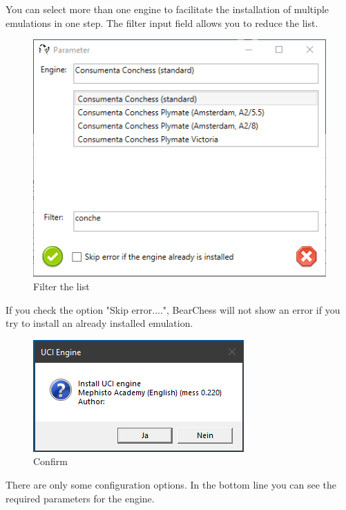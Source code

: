 \documentclass[11pt,a4paper]{article}
\begin{document}
	You can select more than one engine to facilitate the installation of multiple emulations in one step. The filter input field allows you to reduce the list.
	
	\begin{figure}[H]
		\centering
		\includegraphics[scale=0.8]{MessChess5.png}
		\caption{Filter the list}
		\label{fig:MessChess5}
	\end{figure}
	
	If you check the option "Skip error....", BearChess will not show an error if you try to install an already installed emulation.
	
	\begin{figure}[H]
		\centering
		\includegraphics[scale=0.9]{MessChess2.png}
		\caption{Confirm}
		\label{fig:MessChess2}
	\end{figure}
	
	There are only some configuration options. In the bottom line you can see the required parameters for the engine.
	
\end{document}
